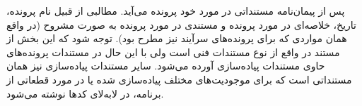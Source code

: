 پس از پیمان‌نامه مستنداتی در مورد خود پرونده می‌آید. مطالبی از قبیل نام پرونده،
تاریخ، خلاصه‌ای در مورد پرونده و مستندی در مورد پرونده به صورت مشروح (در واقع
همان مواردی که برای پرونده‌های سرآیند نیز مطرح بود). توجه شود که این بخش از
مستند در واقع از نوع مستندات فنی است ولی با این حال در مستندات پرونده‌های حاوی
مستندات پیاده‌سازی آورده می‌شود. سایر مستندات پیاده‌سازی نیز همان مستنداتی است
که برای موجودیت‌های مختلف  پیاده‌سازی شده یا در مورد قطعاتی از برنامه، در
لابه‌لای کدها نوشته می‌شود.

